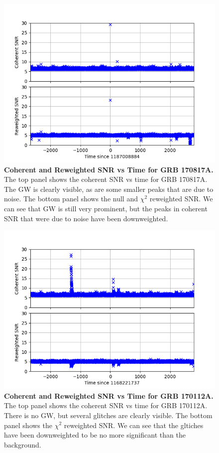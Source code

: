 \documentclass[11pt]{cuthesis}
\begin{document}
\begin{figure} %
\begin{center}
\includegraphics[width=0.8\linewidth]{network_snrs_vs_time_170817.png}
\end{center}
\caption{\textbf{Coherent and Reweighted SNR vs Time for GRB 170817A.} The top panel shows the coherent SNR vs time for GRB 170817A. The GW is clearly visible, as are some smaller peaks that are due to noise. The bottom panel shows the null and $\chi^2$ reweighted SNR. We can see that GW is still very prominent, but the peaks in coherent SNR that were due to noise have been downweighted.} 
\label{fig:snr vs time 170817}
\end{figure}

\begin{figure} %
\begin{center}
\includegraphics[width=0.8\linewidth]{network_snrs_vs_time_GRB170112A.png}
\end{center}
\caption{\textbf{Coherent and Reweighted SNR vs Time for GRB 170112A.} The top panel shows the coherent SNR vs time for GRB 170112A. There is no GW, but several glitches are clearly visible. The bottom panel shows the $\chi^2$ reweighted SNR. We can see that the gltiches have been downweighted to be no more significant than the background.} 
\label{fig:snr vs time GRB170112A}
\end{figure}
\end{document}

